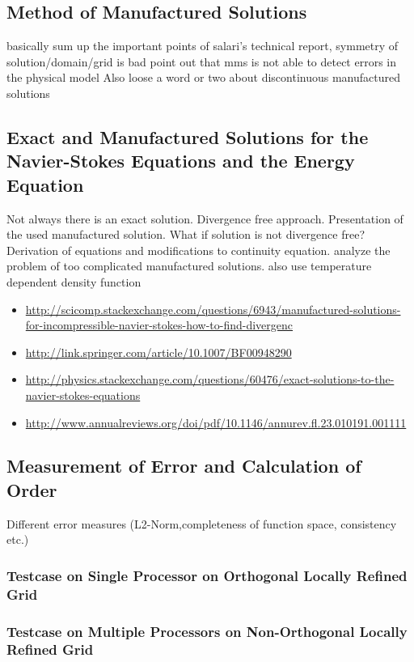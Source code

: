 \documentclass[article,type=msc,colorback,accentcolor=tud2a]{tudthesis}
\begin{document}
    \subsection{Method of Manufactured Solutions}
      basically sum up the important points of salari's technical report, symmetry of solution/domain/grid is bad
      point out that mms is not able to detect errors in the physical model
      Also loose a word or two about discontinuous manufactured solutions

    \subsection{Exact and Manufactured Solutions for the Navier-Stokes Equations and the Energy Equation}
    Not always there is an exact solution. Divergence free approach. Presentation of the used manufactured solution. What if solution is not divergence free? Derivation of equations and modifications to continuity equation. analyze the problem of too complicated manufactured solutions. also use temperature dependent density function
    \begin{itemize}
      \item \url{http://scicomp.stackexchange.com/questions/6943/manufactured-solutions-for-incompressible-navier-stokes-how-to-find-divergenc}
      \item \url{http://link.springer.com/article/10.1007/BF00948290}
      \item \url{http://physics.stackexchange.com/questions/60476/exact-solutions-to-the-navier-stokes-equations}
      \item \url{http://www.annualreviews.org/doi/pdf/10.1146/annurev.fl.23.010191.001111}
    \end{itemize}

    \subsection{Measurement of Error and Calculation of Order}
      Different error measures (L2-Norm,completeness of function space, consistency etc.)

      \subsubsection{Testcase on Single Processor on Orthogonal Locally Refined Grid}
      \subsubsection{Testcase on Multiple Processors on Non-Orthogonal Locally Refined Grid}
\end{document}
